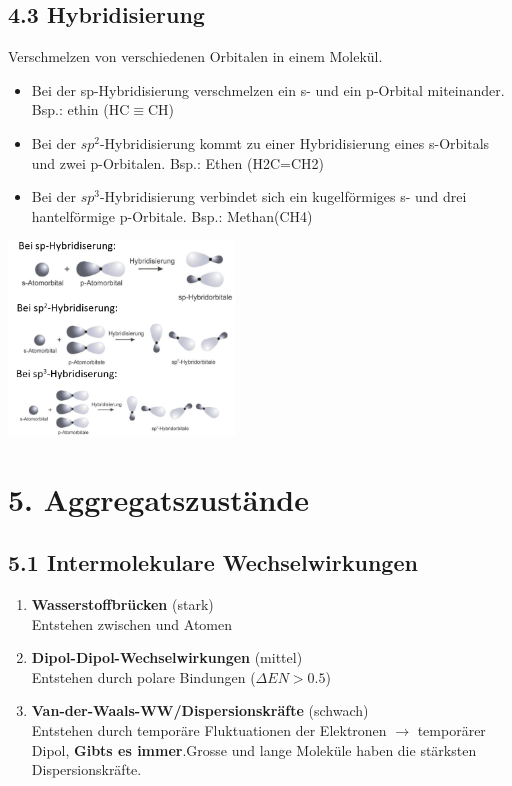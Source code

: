 \begin{multicols*}{4}
\subsection{4.3 Hybridisierung}{
Verschmelzen von verschiedenen Orbitalen in einem Molekül.
    \begin{itemize}[noitemsep, leftmargin=*]
    \item Bei der sp-Hybridisierung verschmelzen ein s- und ein p-Orbital miteinander. Bsp.: ethin (HC$\equiv$CH)
    \item Bei der $sp^2$-Hybridisierung kommt zu einer Hybridisierung eines s-Orbitals und zwei p-Orbitalen. Bsp.: Ethen (H2C=CH2)
    \item Bei der $sp^3$-Hybridisierung verbindet sich ein kugelförmiges s- und drei hantelförmige p-Orbitale. Bsp.: Methan(CH4)
\end{itemize}
\centering
\includegraphics[width=60mm]{Bilder/Hybridorbitale.png}



}



\section{5. Aggregatszustände}

\subsection{5.1 Intermolekulare Wechselwirkungen}{
\begin{enumerate}[noitemsep,leftmargin=*]
    \item \textbf{Wasserstoffbrücken} (stark)\\
     Entstehen zwischen  und  Atomen
    \item \textbf{Dipol-Dipol-Wechselwirkungen} (mittel) \\
     Entstehen durch polare Bindungen ($\Delta EN>0.5$)
    \item \textbf{Van-der-Waals-WW/Dispersionskräfte} (schwach)\\
     Entstehen durch temporäre Fluktuationen der Elektronen $\rightarrow$ temporärer Dipol,
     \textbf{Gibts es immer}.Grosse und lange Moleküle haben die stärksten Dispersionskräfte.
\end{enumerate}
}


\end{multicols*}
